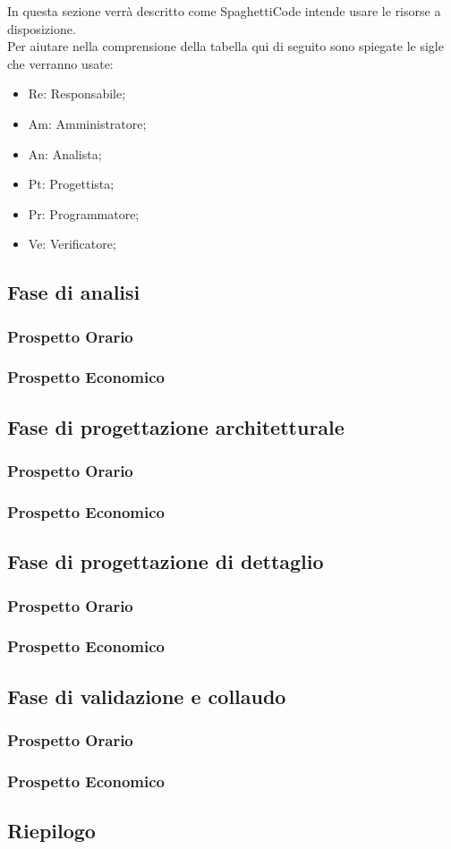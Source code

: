 \documentclass[../piano_di_progetto.tex]{subfiles}
\begin{document}
In questa sezione verrà descritto come SpaghettiCode intende usare le risorse a disposizione. \\
Per aiutare nella comprensione della tabella qui di seguito sono spiegate le sigle che verranno usate:
\begin{itemize}
\item Re: Responsabile;
\item Am: Amministratore;
\item An: Analista;
\item Pt: Progettista;
\item Pr: Programmatore;
\item Ve: Verificatore;
\end{itemize}


\subsection{ Fase di analisi}%
\label{sub:fase_analisi}
\subsubsection{Prospetto Orario}
\subsubsection{Prospetto Economico}

\subsection{ Fase di progettazione architetturale}%
\label{sub:fase_prog_arc}
\subsubsection{Prospetto Orario}
\subsubsection{Prospetto Economico}

\subsection{ Fase di progettazione di dettaglio}%
\label{sub:fase_prog_dett}
\subsubsection{Prospetto Orario}
\subsubsection{Prospetto Economico}

\subsection{ Fase di validazione e collaudo}%
\label{sub:fase_analisi}
\subsubsection{Prospetto Orario}
\subsubsection{Prospetto Economico}

\subsection{ Riepilogo}%
\label{sub:riepilog}
\end{document}
